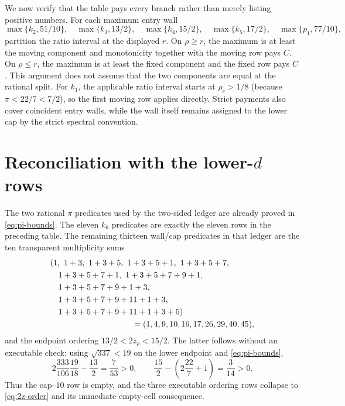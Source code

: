 \documentclass[11pt]{article}
\theoremstyle{remark}
\begin{document}
We now verify that the table pays every branch rather than merely listing
positive numbers.  For each maximum entry wall
\[
 \max\{k_2,51/10\},\quad
 \max\{k_3,13/2\},\quad
 \max\{k_4,15/2\},\quad
 \max\{k_5,17/2\},\quad
 \max\{p_1,77/10\},
\]
partition the ratio interval at the displayed $r$.  On $\rho\geq r$,
the maximum is at least the moving component and monotonicity together
with the moving row pays $C$.  On $\rho\leq r$, the maximum is at least
the fixed component and the fixed row pays $C$.  This argument does not
assume that the two components are equal at the rational split.  For
$k_1$, the applicable ratio interval starts at
$\rho_c>1/8$ (because $\pi<22/7<7/2$), so the first moving row applies
directly.  Strict payments also cover coincident entry walls, while the
wall itself remains assigned to the lower cap by the strict spectral
convention.

\section{Reconciliation with the lower-\texorpdfstring{$d$}{d} rows}

The two rational $\pi$ predicates used by the two-sided ledger are already
proved in \eqref{eq:pi-bounds}.  The eleven $k_6$ predicates are exactly
the eleven rows in the preceding table.  The remaining thirteen
wall/cap predicates in that ledger are the ten transparent multiplicity
sums
\begin{equation}
\begin{aligned}
 &(1,\ 1+3,\ 1+3+5,\ 1+3+5+1,\ 1+3+5+7,\\
 &\quad 1+3+5+7+1,\ 1+3+5+7+9+1,\\
 &\quad 1+3+5+7+9+1+3,\\
 &\quad 1+3+5+7+9+11+1+3,\\
 &\quad 1+3+5+7+9+11+1+3+5)\\
 &\hspace{35mm}=(1,4,9,10,16,17,26,29,40,45),
\end{aligned}
 \label{eq:lower-caps}
\end{equation}
and the endpoint ordering $13/2<2z_\rho<15/2$.  The latter follows
without an executable check: using $\sqrt{337}<19$ on the lower endpoint
and \eqref{eq:pi-bounds},
\begin{equation}
 2\frac{333}{106}\frac{19}{18}-\frac{13}{2}
 =\frac7{53}>0,
 \qquad
 \frac{15}{2}-\left(2\frac{22}{7}+1\right)
 =\frac3{14}>0.
 \label{eq:2z-order}
\end{equation}
Thus the cap--$10$ row is empty, and the three executable ordering rows
collapse to \eqref{eq:2z-order} and its immediate empty-cell consequence.
\end{document}
